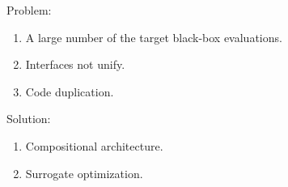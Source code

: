         Problem:
        \begin{enumerate}
            \item A large number of the target black-box evaluations.
            \item Interfaces not unify.
            \item Code duplication.
        \end{enumerate}

        Solution:
        \begin{enumerate}
            \item Compositional architecture.
            \item Surrogate optimization.
        \end{enumerate}

